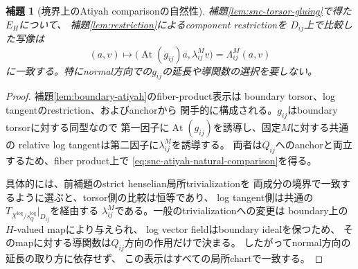 \documentclass[uplatex,dvipdfmx,11pt]{jsarticle}
\numberwithin{equation}{section}
\theoremstyle{plain}
\newtheorem{lemma}[theorem]{補題}
\theoremstyle{definition}
\theoremstyle{remark}
\DeclareMathOperator{\At}{At}
\newcommand{\Tlog}{T_{X^{\log}/s_Q^{\log}}}
\begin{document}
\begin{lemma}[境界上のAtiyah comparisonの自然性]
\label{lem:snc-atiyah-comparison}
補題\ref{lem:snc-torsor-gluing}で得た$E_H$について、
補題\ref{lem:restriction}によるcomponent restrictionを
$D_{ij}$上で比較した写像は
\begin{equation}\label{eq:snc-atiyah-natural-comparison}
(a,v)\longmapsto
\bigl(\At(g_{ij})a,\lambda^M_{ij}v\bigr)
=\Lambda^M_{ij}(a,v)
\end{equation}
に一致する。特にnormal方向での$g_{ij}$の延長や導関数の選択を要しない。
\end{lemma}

\begin{proof}
補題\ref{lem:boundary-atiyah}のfiber-product表示は
boundary torsor、log tangentのrestriction、およびanchorから
関手的に構成される。$g_{ij}$はboundary torsorに対する同型なので
第一因子に$\At(g_{ij})$を誘導し、固定$M$に対する共通の
relative log tangentは第二因子に$\lambda^M_{ij}$を誘導する。
両者は$Q_{ij}$へのanchorと両立するため、fiber product上で
\eqref{eq:snc-atiyah-natural-comparison}を得る。

具体的には、前補題のstrict henselian局所trivializationを
両成分の境界で一致するように選ぶと、torsor側の比較は恒等であり、
log tangent側は共通の$\Tlog|_{D_{ij}}$を経由する
$\lambda^M_{ij}$である。一般のtrivializationへの変更は
boundary上の$H$-valued mapにより与えられ、
log vector fieldはboundary idealを保つため、
そのmapに対する導関数は$Q_{ij}$方向の作用だけで決まる。
したがってnormal方向の延長の取り方に依存せず、
この表示はすべての局所chartで一致する。
\end{proof}
\end{document}
